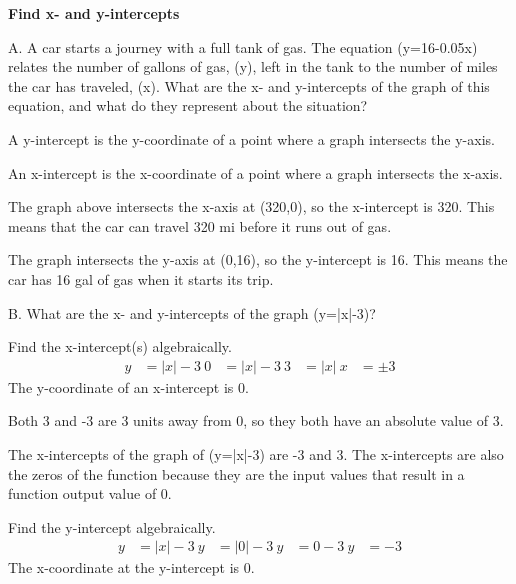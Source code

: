 \documentclass{article}
\newenvironment{example}[1]{}{}         %
\newcommand{\placeholder}[2]{}          %
\begin{document}
\begin{example}{2}
\textbf{Find x- and y-intercepts}

A. A car starts a journey with a full tank of gas. The equation (y=16-0.05x) relates the number of gallons of gas, (y), left in the tank to the number of miles the car has traveled, (x). What are the x- and y-intercepts of the graph of this equation, and what do they represent about the situation?

\placeholder{photo}{Car driving along a winding road through a dry, rocky landscape beside the gas-remaining graph.}


A y-intercept is the y-coordinate of a point where a graph intersects the y-axis.

An x-intercept is the x-coordinate of a point where a graph intersects the x-axis.

The graph above intersects the x-axis at (320,0), so the x-intercept is 320. This means that the car can travel 320 mi before it runs out of gas.

The graph intersects the y-axis at (0,16), so the y-intercept is 16. This means the car has 16 gal of gas when it starts its trip.

B. What are the x- and y-intercepts of the graph (y=|x|-3)?

Find the x-intercept(s) algebraically.
\begin{align*}
y&=|x|-3\
0&=|x|-3\
3&=|x|\
x&=\pm3
\end{align*}
The y-coordinate of an x-intercept is 0.

Both 3 and -3 are 3 units away from 0, so they both have an absolute value of 3.

The x-intercepts of the graph of (y=|x|-3) are -3 and 3. The x-intercepts are also the zeros of the function because they are the input values that result in a function output value of 0.

Find the y-intercept algebraically.
\begin{align*}
y&=|x|-3\
y&=|0|-3\
y&=0-3\
y&=-3
\end{align*}
The x-coordinate at the y-intercept is 0.


\end{example}
\end{document}
